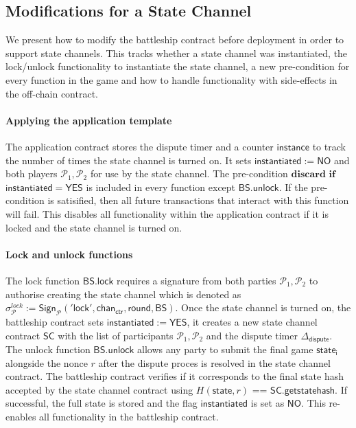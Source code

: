 \documentclass{llncs}
\newcommand{\instantiated}{\mathsf{instantiated}}
\newcommand{\instantiatedno}{\mathsf{NO}}
\newcommand{\instantiatedyes}{\mathsf{YES}}
\newcommand{\stateinfo}{\mathsf{state}}
\newcommand{\stateinfoi}{\mathsf{state}_{\mathsf{i}}}
\newcommand{\participant}{\mathcal{P}}
\newcommand{\statechannel}{\mathsf{SC}}
\newcommand{\statechannelgetcommitment}{\mathsf{SC}.\mathsf{getstatehash}}
\newcommand{\sign}{\mathsf{Sign}}
\newcommand{\battleship}{\mathsf{BS}}
\newcommand{\battleshiplock}{\mathsf{BS.lock}}
\newcommand{\battleshipunlock}{\mathsf{BS.unlock}}
\newcommand{\timerdispute}{\mathsf{\Delta}_{\mathsf{dispute}}}
\begin{document}
\subsection{Modifications for a State Channel}

We present how to modify the battleship contract before deployment in order to support state channels.
This tracks whether a state channel was instantiated,  the lock/unlock functionality to instantiate the state channel, a new pre-condition for every function in the game and how to handle functionality with side-effects in the off-chain contract. 

\paragraph{Applying the application template}
The application contract stores the dispute timer and a counter $\mathsf{instance}$ to track the number of times the state channel is turned on. 
It sets $\instantiated := \instantiatedno$ and both players $\participant_{1},\participant_{2}$ for use by the state channel.
The pre-condition $\textbf{discard if}$ $ \instantiated  = \instantiatedyes$ is included in every function except $\battleshipunlock$. 
If the pre-condition is satisified, then all future transactions that interact with this function will fail.
This disables all functionality within the application contract if it is locked and the state channel is turned on. 

\paragraph{Lock and unlock functions} 
The lock function $\battleshiplock$ requires a signature from both parties $\participant_{1},\participant_{2}$ to authorise creating the state channel which is denoted as $\sigma^{lock}_{\participant} := \sign_{\participant}('\mathsf{lock}', \mathsf{chan}_{\mathsf{ctr}}, \mathsf{round}, \battleship)$.
Once the state channel is turned on, the battleship contract sets $\instantiated := \instantiatedyes$, it creates a new state channel contract $\statechannel$ with the list of participants $\participant_{1},\participant_{2}$ and the dispute timer $\timerdispute$. 
The unlock function $\battleshipunlock$ allows any party to submit the final game $\stateinfoi$ alongside the nonce $r$ after the dispute proces is resolved in the state channel contract. 
The battleship contract verifies if it corresponds to the final state hash accepted by the state channel contract using $H(\stateinfo,r)$ == $\statechannelgetcommitment$.
If successful, the full state is stored and the flag $\instantiated$ is set as $\instantiatedno$.
This re-enables all functionality in the battleship contract. 
\end{document}
